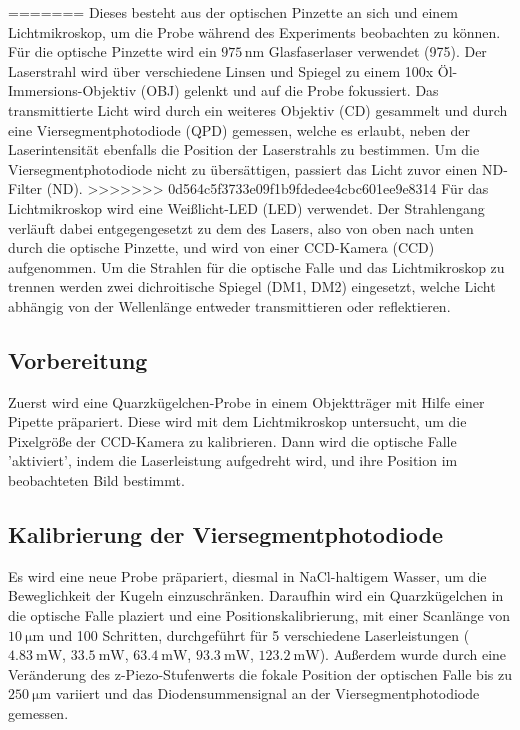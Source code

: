 =======
  Dieses besteht aus der optischen Pinzette an sich und einem Lichtmikroskop, um die Probe während des Experiments beobachten zu können.
  Für die optische Pinzette wird ein $975\,\text{nm}$ Glasfaserlaser verwendet (975). Der Laserstrahl wird über verschiedene Linsen und Spiegel zu einem 100x Öl-Immersions-Objektiv (OBJ) gelenkt und auf die Probe fokussiert. Das transmittierte Licht wird durch ein weiteres Objektiv (CD) gesammelt und durch eine Viersegmentphotodiode (QPD) gemessen, welche es erlaubt, neben der Laserintensität ebenfalls die Position der Laserstrahls zu bestimmen. Um die Viersegmentphotodiode nicht zu übersättigen, passiert das Licht zuvor einen ND-Filter (ND).
>>>>>>> 0d564c5f3733e09f1b9fdedee4cbc601ee9e8314
  Für das Lichtmikroskop wird eine Weißlicht-LED (LED) verwendet. Der Strahlengang verläuft dabei entgegengesetzt zu dem des Lasers, also von oben nach unten durch die optische Pinzette, und wird von einer CCD-Kamera (CCD) aufgenommen.
  Um die Strahlen für die optische Falle und das Lichtmikroskop zu trennen werden zwei dichroitische Spiegel (DM1, DM2) eingesetzt, welche Licht abhängig von der Wellenlänge entweder transmittieren oder reflektieren.
  \subsection{Vorbereitung}
    Zuerst wird eine Quarzkügelchen-Probe in einem Objektträger mit Hilfe einer Pipette präpariert. Diese wird mit dem Lichtmikroskop untersucht, um die Pixelgröße der CCD-Kamera zu kalibrieren. Dann wird die optische Falle 'aktiviert', indem die Laserleistung aufgedreht wird, und ihre Position im beobachteten Bild bestimmt.
  \subsection{Kalibrierung der Viersegmentphotodiode}
  \label{sec:Kalib}
    Es wird eine neue Probe präpariert, diesmal in NaCl-haltigem Wasser, um die Beweglichkeit der Kugeln einzuschränken. Daraufhin wird ein Quarzkügelchen in die optische Falle plaziert und eine Positionskalibrierung, mit einer Scanlänge von $\SI{10}{\micro\metre}$ und 100 Schritten, durchgeführt für 5 verschiedene Laserleistungen ($\SI{4.83}{\milli\watt}$, $\SI{33.5}{\milli\watt}$, $\SI{63.4}{\milli\watt}$, $\SI{93.3}{\milli\watt}$, $\SI{123.2}{\milli\watt}$).
    Außerdem wurde durch eine Veränderung des z-Piezo-Stufenwerts die fokale Position der optischen Falle bis zu $\SI{250}{\micro\metre}$ variiert und das Diodensummensignal an der Viersegmentphotodiode gemessen.

